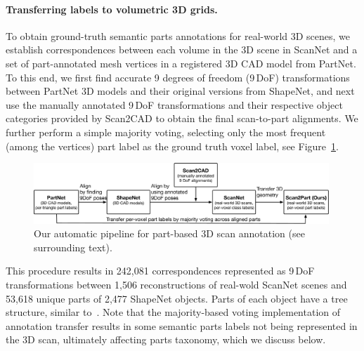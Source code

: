 \paragraph{Transferring labels to volumetric 3D grids.} 
To obtain ground-truth semantic parts annotations for real-world 3D scenes, we establish  correspondences between each volume in the 3D scene in ScanNet and a set of part-annotated mesh vertices in a registered 3D CAD model from PartNet.
To this end, we first find accurate 9 degrees of freedom (9\,DoF) transformations between PartNet 3D models and their original versions from ShapeNet, and next use the manually annotated 9\,DoF transformations and their respective object categories provided by Scan2CAD to obtain the final scan-to-part alignments.
We further perform a simple majority voting, selecting only the most frequent (among the vertices) part label as the ground truth voxel label, see Figure~\ref{fig:scan2part_labels_transfer}.

\begin{figure}[!h]
\label{fig:scan2part_labels_transfer}
\centering
\includegraphics[width=0.99\textwidth]{Figures/scan2part/scan2part_labels_transfer.pdf}
\caption{Our automatic pipeline for part-based 3D scan annotation (see surrounding text).}
\end{figure}



This procedure results in 242,081 correspondences represented as 9\,DoF transformations between 1,506 reconstructions of real-wold ScanNet scenes and 53,618 unique parts of 2,477 ShapeNet objects.
Parts of each object have a tree structure, similar to~\cite{mo2019partnet}.
Note that the majority-based voting implementation of annotation transfer results in some semantic parts labels not being represented in the 3D scan, ultimately affecting parts taxonomy, which we discuss below. 


